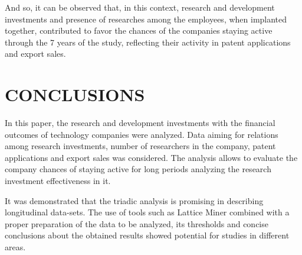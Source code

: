 \documentclass[a4paper,twoside]{article}
\begin{document}
And so, it can be observed that, in this context, research and development investments and presence of researches among the employees, when implanted together, contributed to favor the chances of the companies staying active through the 7 years of the study, reflecting their activity in patent applications and export sales.

\section{\uppercase{Conclusions}}
\label{sec:conclusion}

In this paper, the research and development investments with the financial outcomes of technology companies were analyzed. Data aiming for relations among research investments, number of researchers in the company, patent applications and export sales was considered. The analysis allows to evaluate the company chances of staying active for long periods analyzing the research investment effectiveness in it.

It was demonstrated that the triadic analysis is promising in describing longitudinal data-sets. The use of tools such as Lattice Miner combined with a proper preparation of the data to be analyzed, its thresholds and concise conclusions about the obtained results showed potential for studies in different areas.
\end{document}
